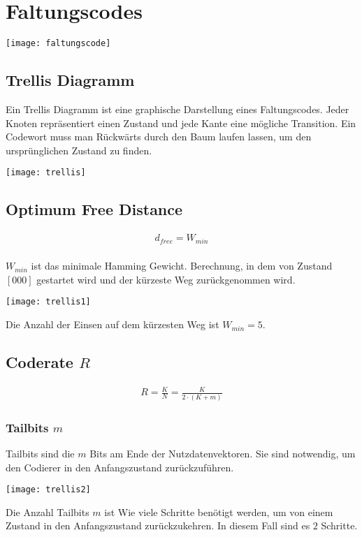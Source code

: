 \vspace*{20\baselineskip}
\section{Faltungscodes}
\begin{center}
    \texttt{[image: faltungscode]}
\end{center}
\subsection{Trellis Diagramm}
Ein Trellis Diagramm ist eine graphische Darstellung eines Faltungscodes. 
Jeder Knoten repräsentiert einen Zustand und jede Kante eine mögliche Transition.
Ein Codewort muss man Rückwärts durch den Baum laufen lassen, um den ursprünglichen Zustand zu finden.

\begin{center}
    \texttt{[image: trellis]}
\end{center}
\subsection{Optimum Free Distance}
\begin{align*}
    d_{free} = W_{min}
\end{align*}
\\
$W_{min}$ ist das minimale Hamming Gewicht. Berechnung, in dem von
Zustand $[000]$ gestartet wird und der kürzeste Weg zurückgenommen wird.
\begin{center}
    \texttt{[image: trellis1]}
\end{center}
Die Anzahl der Einsen auf dem kürzesten Weg ist $W_{min} = 5$.

\subsection{Coderate $R$}
\begin{align*}
    R = \frac{K}{N} = \frac{K}{2 \cdot (K + m)}
\end{align*}
\subsubsection{Tailbits $m$}
Tailbits sind die $m$ Bits am Ende der Nutzdatenvektoren. Sie sind notwendig, um den Codierer in den 
Anfangszustand zurückzuführen.
\begin{center}
    \texttt{[image: trellis2]}
\end{center}
Die Anzahl Tailbits $m$ ist Wie viele Schritte benötigt werden, um von einem 
Zustand in den Anfangszustand zurückzukehren. In diesem Fall sind es $2$ Schritte.